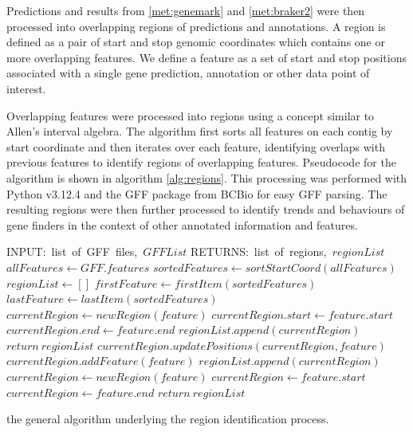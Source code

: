 Predictions and results from \ref{met:genemark} and \ref{met:braker2}
were then processed into overlapping regions of predictions and
annotations. A region is defined as a pair of start and stop genomic
coordinates which contains one or more overlapping features. We define
a feature as a set of start and stop positions associated with a
single gene prediction, annotation or other data point of interest.

Overlapping features were processed into regions using a concept
similar to Allen's interval algebra\cite{DECHTER2003333}. The
algorithm first sorts all features on each contig by start coordinate
and then iterates over each feature, identifying overlaps with
previous features to identify regions of overlapping
features. Pseudocode for the algorithm is shown in algorithm
\ref{alg:regions}. This processing was performed with Python
v3.12.4\cite{Foundation} and the GFF package from BCBio\cite{Chapman}
for easy GFF parsing.  The resulting regions were then further
processed to identify trends and behaviours of gene finders in the
context of other annotated information and features.

\begin{algorithm}
  \begin{algorithmic}
    \State INPUT:\ list\ of\ GFF\ files,\ $GFFList$
    \State RETURNS:\ list\ of\ regions,\ $regionList$
    \State $allFeatures \gets GFF.features$
    \EndFor
    \State $sortedFeatures \gets sortStartCoord(allFeatures)$
    \State $regionList \gets []$
    \State $firstFeature \gets firstItem(sortedFeatures)$
    \State $lastFeature \gets lastItem(sortedFeatures)$
        \State $currentRegion \gets newRegion(feature)$
        \State $currentRegion.start \gets feature.start$
        \State $currentRegion.end \gets feature.end$
        \State $regionList.append(currentRegion)$
        \State $return\ regionList$
        \State $currentRegion.updatePositions(currentRegion, feature)$
        \State $currentRegion.addFeature(feature)$
      \Else
        \State $regionList.append(currentRegion)$
        \State $currentRegion \gets newRegion(feature)$
        \State $currentRegion \gets feature.start$
        \State $currentRegion \gets feature.end$
      \EndIf
    \EndFor
    \State $return\ regionList$
  \end{algorithmic}
  \caption{the general algorithm underlying the region identification
    process.}
  \label{alg:regions}
\end{algorithm}

